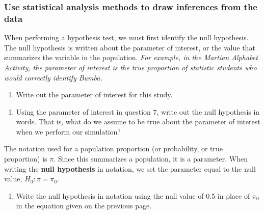 \documentclass[
]{report}
\providecommand{\tightlist}{%
  \setlength{\itemsep}{0pt}\setlength{\parskip}{0pt}}
\begin{document}
\hypertarget{use-statistical-analysis-methods-to-draw-inferences-from-the-data}{%
\subsubsection*{Use statistical analysis methods to draw inferences from the data}\label{use-statistical-analysis-methods-to-draw-inferences-from-the-data}}

When performing a hypothesis test, we must first identify the null hypothesis. The null hypothesis is written about the parameter of interest, or the value that summarizes the variable in the population. \emph{For example, in the Martian Alphabet Activity, the parameter of interest is the true proportion of statistic students who would correctly identify Bumba.}

\begin{enumerate}
\def\labelenumi{\arabic{enumi}.}
\setcounter{enumi}{6}
\tightlist
\item
  Write out the parameter of interest for this study.
\end{enumerate}

\vspace{0.8in}

\begin{enumerate}
\def\labelenumi{\arabic{enumi}.}
\setcounter{enumi}{7}
\tightlist
\item
  Using the parameter of interest in question 7, write out the null hypothesis in words. That is, what do we assume to be true about the parameter of interest when we perform our simulation?
\end{enumerate}

\vspace{0.8in}

The notation used for a population proportion (or probability, or true proportion) is \(\pi\). Since this summarizes a population, it is a parameter. When writing the \textbf{null hypothesis} in notation, we set the parameter equal to the null value, \(H_0: \pi = \pi_0\).

\begin{enumerate}
\def\labelenumi{\arabic{enumi}.}
\setcounter{enumi}{8}
\tightlist
\item
  Write the null hypothesis in notation using the null value of 0.5 in place of \(\pi_0\) in the equation given on the previous page.
\end{enumerate}
\end{document}
